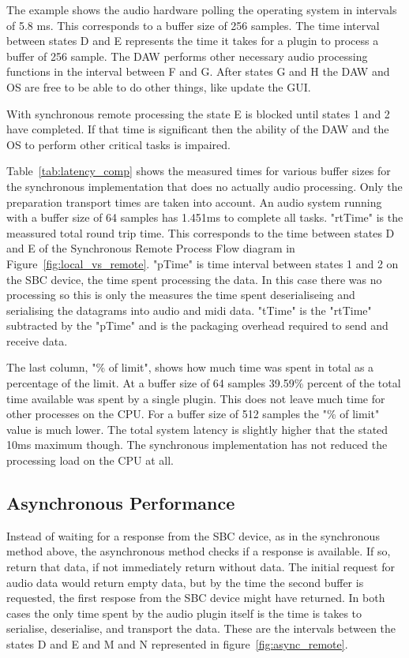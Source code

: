 The example shows the audio hardware polling the operating system in intervals of 5.8 ms. This corresponds to a buffer size of 256 samples. The time interval between states D and E represents the time it takes for a plugin to process a buffer of 256 sample. The DAW  performs other necessary audio processing functions in the interval between F and G. After states G and H the DAW and OS are free to be able to do other things, like update the GUI.

With synchronous remote processing the state E is blocked until states 1 and 2 have completed. If that time is significant then the ability of the DAW and the OS to perform other critical tasks is impaired.



Table~\ref{tab:latency_comp} shows the measured times for various buffer sizes for the synchronous implementation that does no actually audio processing. Only the preparation transport times are taken into account. An audio system running with a buffer size of 64 samples has 1.451ms to complete all tasks. "rtTime" is the meassured total round trip time. This corresponds to the time between states D and E of the Synchronous Remote Process Flow diagram in Figure~\ref{fig:local_vs_remote}. "pTime" is time interval between states 1 and 2 on the SBC device, the time spent processing the data. In this case there was no processing so this is only the measures the time spent deserialiseing and serialising the datagrams into audio and midi data. "tTime" is the "rtTime" subtracted by the "pTime" and is the packaging overhead required to send and receive data.

The last column, "\% of limit", shows how much time was spent in total as a percentage of the limit. At a buffer size of 64 samples 39.59\% percent of the total time available was spent by a single plugin. This does not leave much time for other processes on the CPU. For a buffer size of 512 samples the "\% of limit" value is much lower. The total system latency is slightly higher that the stated 10ms maximum though. The synchronous implementation has not reduced the processing load on the CPU at all.


\subsection{Asynchronous Performance}

Instead of waiting for a response from the SBC device, as in the synchronous method above, the asynchronous method checks if a response is available. If so, return that data, if not immediately return without data. The initial request for audio data would return empty data, but by the time the second buffer is requested, the first respose from the SBC device might have returned. In both cases the only time spent by the audio plugin itself is the time is takes to serialise, deserialise, and transport the data. These are the intervals between the states D and E and M and N represented in figure~\ref{fig:async_remote}.

